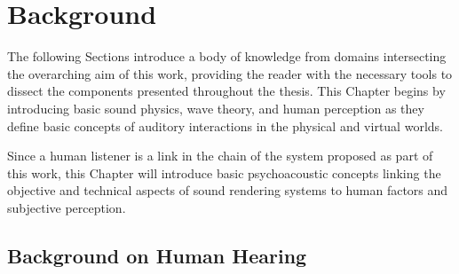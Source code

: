 \chapter{Background}\label{ch:Background}

The following Sections introduce a body of knowledge from domains intersecting the overarching aim of this work, providing the reader with the necessary tools to dissect the components presented throughout the thesis. This Chapter begins by introducing basic sound physics, wave theory, and human perception as they define basic concepts of auditory interactions in the physical and virtual worlds.\par
Since a human listener is a link in the chain of the system proposed as part of this work, this Chapter will introduce basic psychoacoustic concepts linking the objective and technical aspects of sound rendering systems to human factors and subjective perception.

\section{Background on Human Hearing}
